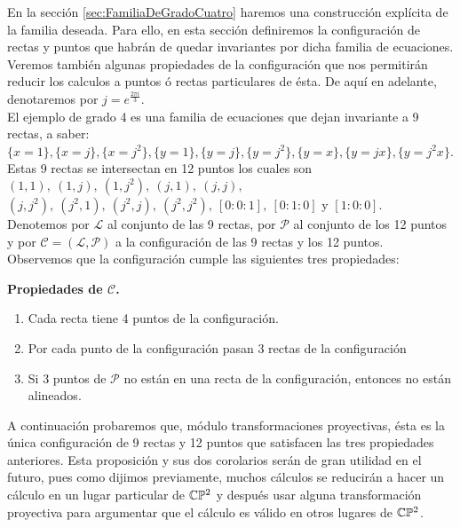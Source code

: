 En la sección \ref{sec:FamiliaDeGradoCuatro} haremos una construcción explícita de la familia deseada. Para ello, en esta sección definiremos la configuración de rectas y puntos que habrán de quedar invariantes por dicha familia de ecuaciones. Veremos también algunas propiedades de la configuración que nos permitirán reducir los calculos a puntos ó rectas particulares de ésta. De aquí en adelante, denotaremos por $j=e^{\frac{2\pi i}{3}}$.
\\


El ejemplo de grado 4 es una familia de ecuaciones que dejan invariante a 9 rectas, a saber: $\{x=1\}, \{x=j\}, \{x=j^{2}\}, \{y=1\}, \{y=j\}, \{y=j^{2}\}, \{y=x\}, \{y=jx\}, \{y=j^{2}x\}$.
\\

Estas 9 rectas se intersectan en 12 puntos los cuales son $(1,1),\ (1,j),\ (1,j^{2}),\ (j,1),\ (j,j),$\\ $(j,j^{2}),\ (j^{2},1),\ (j^{2},j),\ (j^{2},j^{2}),\ [0:0:1],\ [0:1:0]$ y $[1:0:0]$.
\\

Denotemos por $\mathcal{L}$ al conjunto de las 9 rectas, por $\mathcal{P}$ al conjunto de los 12 puntos y por $\mathcal{C=(L,P)}$ a la configuración de las 9 rectas y los 12 puntos.
\\

Observemos que la configuración cumple las siguientes tres propiedades:

\textbf{Propiedades de $\mathcal{C}$.}

\begin{enumerate}

\item Cada recta tiene 4 puntos de la configuración.
\item Por cada punto de la configuración pasan 3 rectas de la configuración
\item Si 3 puntos de $\mathcal{P}$ no están en una recta de la configuración, entonces no están alineados.

\end{enumerate} 

A continuación probaremos que, módulo transformaciones proyectivas, ésta es la única configuración de 9 rectas y 12 puntos que satisfacen las tres propiedades anteriores. Esta proposición y sus dos corolarios serán de gran utilidad en el futuro, pues como dijimos previamente, muchos cálculos se reducirán a hacer un cálculo en un lugar particular de $\mathbb{C}\mathbb{P}^2$ y después usar alguna transformación proyectiva para argumentar que el cálculo es válido en otros lugares de $\mathbb{C}\mathbb{P}^2$.
\\

